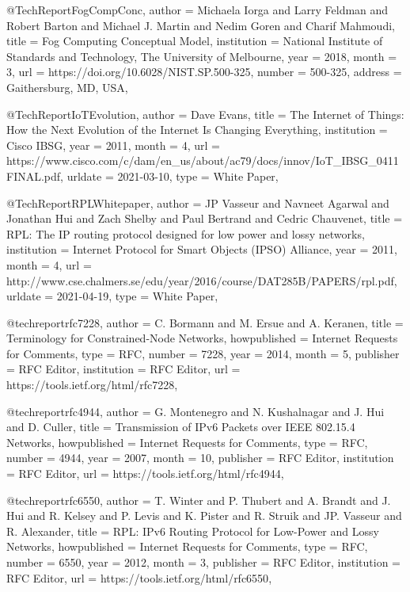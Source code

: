 \documentclass[english,version-2019-11]{uzl-thesis}
\begin{document}
\begin{bibtex-entries}
   

@TechReport{FogCompConc,
  author =       {Michaela Iorga and Larry Feldman and Robert Barton and Michael J. Martin and Nedim Goren and Charif Mahmoudi},
  title =        {Fog Computing Conceptual Model},
  institution =  {National Institute of Standards and Technology, The University of Melbourne},
  year =         {2018},
  month =        {3},
  url =          {https://doi.org/10.6028/NIST.SP.500-325},
  number =       {500-325},
  address =      {Gaithersburg, MD, USA},
}

@TechReport{IoTEvolution,
  author =       {Dave Evans},
  title =        {The Internet of Things: How the Next Evolution of the Internet Is Changing Everything},
  institution =  {Cisco IBSG},
  year =         {2011},
  month =        {4},
  url =          {https://www.cisco.com/c/dam/en_us/about/ac79/docs/innov/IoT_IBSG_0411FINAL.pdf},
  urldate =      {2021-03-10},
  type =         {White Paper},
}

@TechReport{RPLWhitepaper,
  author =       {JP Vasseur and Navneet Agarwal and Jonathan Hui and Zach Shelby and Paul Bertrand and Cedric Chauvenet},
  title =        {RPL: The IP routing protocol designed for low power and lossy networks},
  institution =  {Internet Protocol for Smart Objects (IPSO) Alliance},
  year =         {2011},
  month =        {4},
  url =          {http://www.cse.chalmers.se/edu/year/2016/course/DAT285B/PAPERS/rpl.pdf},
  urldate =      {2021-04-19},
  type =         {White Paper},
}

@techreport{rfc7228,
  author        = {C. Bormann and M. Ersue and A. Keranen},
  title         = {Terminology for Constrained-Node Networks},
  howpublished  = {Internet Requests for Comments},
  type          = {RFC},
  number        = {7228},
  year          = {2014},
  month         = {5},
  publisher     = {RFC Editor},
  institution   = {RFC Editor},
  url           = {https://tools.ietf.org/html/rfc7228},
}

@techreport{rfc4944,
  author        = {G. Montenegro and N. Kushalnagar and J. Hui and D. Culler},
  title         = {Transmission of IPv6 Packets over IEEE 802.15.4 Networks},
  howpublished  = {Internet Requests for Comments},
  type          = {RFC},
  number        = {4944},
  year          = {2007},
  month         = {10},
  publisher     = {RFC Editor},
  institution   = {RFC Editor},
  url           = {https://tools.ietf.org/html/rfc4944},
}

@techreport{rfc6550,
  author        = {T. Winter and P. Thubert and A. Brandt and J. Hui and R. Kelsey and P. Levis and K. Pister and R. Struik and JP. Vasseur and R. Alexander},
  title         = {RPL: IPv6 Routing Protocol for Low-Power and Lossy Networks},
  howpublished  = {Internet Requests for Comments},
  type          = {RFC},
  number        = {6550},
  year          = {2012},
  month         = {3},
  publisher     = {RFC Editor},
  institution   = {RFC Editor},
  url           = {https://tools.ietf.org/html/rfc6550},
}


\end{bibtex-entries}
\end{document}
